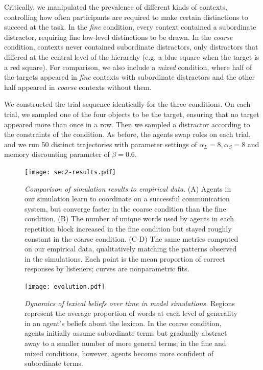 Critically, we manipulated the prevalence of different kinds of contexts, controlling how often participants are required to make certain distinctions to succeed at the task. 
In the \emph{fine} condition, every context contained a subordinate distractor, requiring fine low-level distinctions to be drawn.
In the \emph{coarse} condition, contexts never contained subordinate distractors, only distractors that differed at the central level of the hierarchy (e.g. a blue square when the target is a red square).
For comparison, we also include a \emph{mixed} condition, where half of the targets appeared in \emph{fine} contexts with subordinate distractors and the other half appeared in \emph{coarse} contexts without them.

We constructed the trial sequence identically for the three conditions. 
On each trial, we sampled one of the four objects to be the target, ensuring that no target appeared more than once in a row.
Then we sampled a distractor according to the constraints of the condition.
As before, the agents swap roles on each trial, and we run 50 distinct trajectories with parameter settings of $\alpha_L=8, \alpha_S=8$ and memory discounting parameter of $\beta = 0.6$.%


\begin{figure}[t]
\begin{center}
\texttt{[image: sec2-results.pdf]}
\vspace{1ex}
\caption{\emph{Comparison of simulation results to empirical data}. (A) Agents in our simulation learn to coordinate on a successful communication system, but converge faster in the coarse condition than the fine condition.  (B) The number of unique words used by agents in each repetition block increased in the fine condition but stayed roughly constant in the coarse condition. (C-D) The same metrics computed on our empirical data, qualitatively matching the patterns observed in the simulations. Each point is the mean proportion of correct responses by listeners; curves are nonparametric fits.}
\label{fig:sec2Results}
\end{center}
\end{figure}

\begin{figure}[h]
\begin{center}
\texttt{[image: evolution.pdf]}
\caption{\emph{Dynamics of lexical beliefs over time in model simulations.} Regions represent the average proportion of words at each level of generality in an agent's beliefs about the lexicon. In the coarse condition, agents initially assume subordinate terms but gradually abstract away to a smaller number of more general terms; in the fine and mixed conditions, however, agents become more confident of subordinate terms.}
\label{fig:evolution}
\end{center}
\end{figure}


